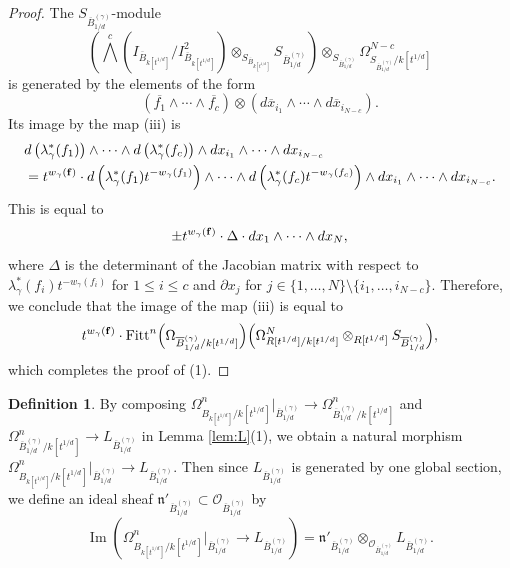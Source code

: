 \documentclass[a4paper,11pt]{amsart}
\theoremstyle{definition}
\newtheorem{defi}[thm]{Definition}
\theoremstyle{remark}
\begin{document}
\begin{proof}
The $S_{\overline{B}^{(\gamma)}_{1/d}}$-module 
\[
\left( \bigwedge ^{c} \left( I_{\overline{B}_{k[t^{1/d}]}}/ I^2_{\overline{B}_{k[t^{1/d}]}} \right) \otimes _{S_{\overline{B}_{k[t^{1/d}]}}} S_{\overline{B}^{(\gamma)}_{1/d}} \right) \otimes _{S_{\overline{B}^{(\gamma)}_{1/d}}} \Omega _{S_{\overline{B}^{(\gamma)}_{1/d}}/k[t^{1/d}]} ^{N-c}
\]
is generated by the elements of the form 
\[
\left( \overline{f_1} \wedge \cdots \wedge \overline{f_c} \right) \otimes \left( d \overline{x}_{i _1} \wedge \cdots \wedge d \overline{x}_{i_{N-c}} \right). 
\]
Its image by the map (iii) is
\begin{align*}
&d \left( \lambda _{\gamma} ^* (f_1) \right) \wedge \cdots \wedge d \left( \lambda _{\gamma} ^* (f_c) \right) \wedge  d x_{i _1} \wedge \cdots \wedge d x_{i_{N-c}} \\
&=t^{w_{\gamma}({\bf f})} \cdot d \left( \lambda _{\gamma} ^* (f_1) t^{- w_{\gamma} (f_1)} \right) \wedge \cdots \wedge d \left( \lambda _{\gamma} ^* (f_c) t^{- w_{\gamma} (f_c)} \right) \wedge d x_{i _1} \wedge \cdots \wedge dx_{i_{N-c}}. 
\end{align*}
This is equal to 
\[
\pm t^{w_{\gamma}({\bf f})} \cdot \Delta \cdot dx_1 \wedge \cdots \wedge dx_N, 
\]
where $\Delta$ is the determinant of the Jacobian matrix with respect to $\lambda _{\gamma} ^* (f_i) t^{- w_{\gamma} (f_i)}$ for $1 \le i \le c$ and $\partial x_j$ for $j \in \{ 1, \ldots ,N \} \setminus \{ i_1, \ldots, i_{N-c} \}$. 
Therefore, we conclude that the image of the map (iii) is equal to 
\[
t^{w_\gamma({\bf f})} \cdot \operatorname{Fitt}^n \Bigl ( \Omega _{\overline{B}^{(\gamma)}_{1/d}/k[t^{1/d}]} \Bigr) \Bigl ( \Omega _{R[t^{1/d}]/k[t^{1/d}]} ^N \otimes _{R[t^{1/d}]} S_{\overline{B}^{(\gamma)}_{1/d}} \Bigr), 
\]
which completes the proof of (1). 
\end{proof}

\begin{defi}
By composing $\Omega^n _{B_{k[t^{1/d}]}/k[t^{1/d}]} \big|_{\overline{B}^{(\gamma)}_{1/d}} \to \Omega ^n _{\overline{B}^{(\gamma)}_{1/d}/k[t^{1/d}]}$ and $\Omega ^n _{\overline{B}^{(\gamma)}_{1/d}/k[t^{1/d}]} \to L_{\overline{B}^{(\gamma)}_{1/d}}$ in Lemma \ref{lem:L}(1), 
we obtain a natural morphism $\Omega^n _{B_{k[t^{1/d}]}/k[t^{1/d}]} \big|_{\overline{B}^{(\gamma)}_{1/d}} \to L_{\overline{B}^{(\gamma)}_{1/d}}$. 
Then since $L_{\overline{B}^{(\gamma)}_{1/d}}$ is generated by one global section, we define an ideal sheaf 
$\mathfrak{n}'_{\overline{B}^{(\gamma)}_{1/d}} \subset \mathcal{O}_{\overline{B}^{(\gamma)}_{1/d}}$ by
\[
\operatorname{Im} \left( 
\Omega^n _{B_{k[t^{1/d}]}/k[t^{1/d}]} \big|_{\overline{B}^{(\gamma)}_{1/d}} \to L_{\overline{B}^{(\gamma)}_{1/d}}  
\right) = \mathfrak{n}'_{\overline{B}^{(\gamma)}_{1/d}} \otimes _{\mathcal{O}_{\overline{B}^{(\gamma)}_{1/d}}} L_{\overline{B}^{(\gamma)}_{1/d}}. 
\]
\end{defi}
\end{document}
